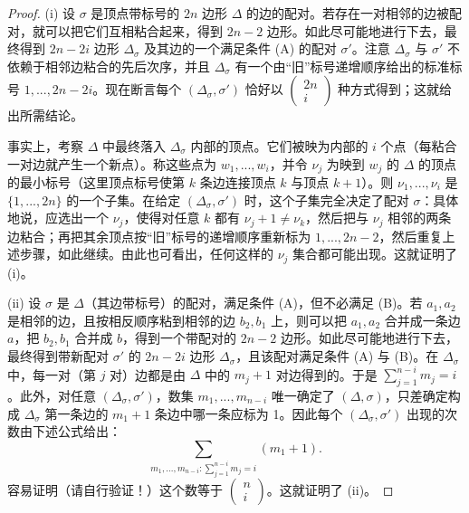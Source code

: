 \begin{proof}(i) 设 $\sigma$ 是顶点带标号的 $2n$ 边形 $\Delta$ 的边的配对。若存在一对相邻的边被配对，就可以把它们互相粘合起来，得到 $2n-2$ 边形。如此尽可能地进行下去，最终得到 $2n-2i$ 边形 $\Delta_\sigma$ 及其边的一个满足条件 (A) 的配对 $\sigma'$。注意 $\Delta_\sigma$ 与 $\sigma'$ 不依赖于相邻边粘合的先后次序，并且 $\Delta_\sigma$ 有一个由“旧”标号递增顺序给出的标准标号 $1,...,2n-2i$。现在断言每个 $(\Delta_\sigma,\sigma')$ 恰好以 $\begin{pmatrix}2n\\ i\end{pmatrix}$ 种方式得到；这就给出所需结论。

事实上，考察 $\Delta$ 中最终落入 $\Delta_\sigma$ 内部的顶点。它们被映为内部的 $i$ 个点（每粘合一对边就产生一个新点）。称这些点为 $w_1,...,w_i$，并令 $\nu_j$ 为映到 $w_j$ 的 $\Delta$ 的顶点的最小标号（这里顶点标号使第 $k$ 条边连接顶点 $k$ 与顶点 $k+1$）。则 $\nu_1,...,\nu_i$ 是 $\lbrace{1,...,2n\rbrace}$ 的一个子集。在给定 $(\Delta_\sigma,\sigma')$ 时，这个子集完全决定了配对 $\sigma$：具体地说，应选出一个 $\nu_j$，使得对任意 $k$ 都有 $\nu_{j}+1\ne \nu_k$，然后把与 $\nu_j$ 相邻的两条边粘合；再把其余顶点按“旧”标号的递增顺序重新标为 $1,...,2n-2$，然后重复上述步骤，如此继续。由此也可看出，任何这样的 $\nu_j$ 集合都可能出现。这就证明了 (i)。

(ii) 设 $\sigma$ 是 $\Delta$（其边带标号）的配对，满足条件 (A)，但不必满足 (B)。若 $a_1,a_2$ 是相邻的边，且按相反顺序粘到相邻的边 $b_2,b_1$ 上，则可以把 $a_1,a_2$ 合并成一条边 $a$，把 $b_2,b_1$ 合并成 $b$，得到一个带配对的 $2n-2$ 边形。如此尽可能地进行下去，最终得到带新配对 $\sigma'$ 的 $2n-2i$ 边形 $\Delta_\sigma$，且该配对满足条件 (A) 与 (B)。在 $\Delta_\sigma$ 中，每一对（第 $j$ 对）边都是由 $\Delta$ 中的 $m_j+1$ 对边得到的。于是 $\sum_{j=1}^{n-i}m_j=i$。此外，对任意 $(\Delta_\sigma,\sigma')$，数集 $m_1,...,m_{n-i}$ 唯一确定了 $(\Delta,\sigma)$，只差确定构成 $\Delta_\sigma$ 第一条边的 $m_1+1$ 条边中哪一条应标为 1。因此每个 $(\Delta_\sigma,\sigma')$ 出现的次数由下述公式给出：
$$
\sum_{m_1,...,m_{n-i}:\sum_{j=1}^{n-i} m_j=i}(m_1+1).
$$
容易证明（请自行验证！）这个数等于 $\begin{pmatrix}n\\ i\end{pmatrix}$。这就证明了 (ii)。
\end{proof}


